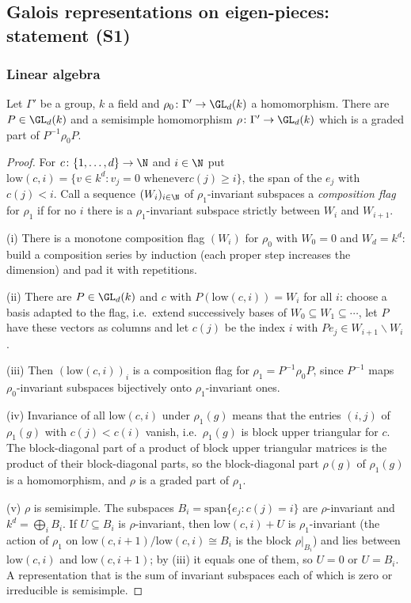 \subsection{Galois representations on eigen-pieces: statement (S1)}\label{sec:pf:steps2:repex}

\subsubsection{Linear algebra}

\begin{lemma}[Semisimplification]\label{lem:pf:steps2:grex}
Let $\Gamma'$ be a group, $k$ a field and $\rho_0\colon\Gamma'\to\GL_d(k)$ a homomorphism. There are
$P\in\GL_d(k)$ and a semisimple homomorphism $\rho\colon\Gamma'\to\GL_d(k)$ which is a graded part
of $P^{-1}\rho_0P$.
\end{lemma}

\begin{proof}
For $c\colon\{1,\dots,d\}\to\N$ and $i\in\N$ put $\mathrm{low}(c,i)=\{v\in k^d:v_j=0\text{ whenever
}c(j)\ge i\}$, the span of the $e_j$ with $c(j)<i$. Call a sequence $(W_i)_{i\in\N}$ of
$\rho_1$-invariant subspaces a \emph{composition flag} for $\rho_1$ if for no $i$ there is a
$\rho_1$-invariant subspace strictly between $W_i$ and $W_{i+1}$.

(i) There is a monotone composition flag $(W_i)$ for $\rho_0$ with $W_0=0$ and $W_d=k^d$: build a
composition series by induction (each proper step increases the dimension) and pad it with
repetitions.

(ii) There are $P\in\GL_d(k)$ and $c$ with $P(\mathrm{low}(c,i))=W_i$ for all $i$: choose a basis
adapted to the flag, i.e.\ extend successively bases of $W_0\subseteq W_1\subseteq\cdots$, let $P$
have these vectors as columns and let $c(j)$ be the index $i$ with $Pe_j\in W_{i+1}\smallsetminus
W_i$.

(iii) Then $(\mathrm{low}(c,i))_i$ is a composition flag for $\rho_1=P^{-1}\rho_0P$, since $P^{-1}$
maps $\rho_0$-invariant subspaces bijectively onto $\rho_1$-invariant ones.

(iv) Invariance of all $\mathrm{low}(c,i)$ under $\rho_1(g)$ means that the entries $(i,j)$ of
$\rho_1(g)$ with $c(j)<c(i)$ vanish, i.e.\ $\rho_1(g)$ is block upper triangular for $c$. The
block-diagonal part of a product of block upper triangular matrices is the product of their
block-diagonal parts, so the block-diagonal part $\rho(g)$ of $\rho_1(g)$ is a homomorphism, and
$\rho$ is a graded part of $\rho_1$.

(v) $\rho$ is semisimple. The subspaces $B_i=\mathrm{span}\{e_j:c(j)=i\}$ are $\rho$-invariant and
$k^d=\bigoplus_iB_i$. If $U\subseteq B_i$ is $\rho$-invariant, then $\mathrm{low}(c,i)+U$ is
$\rho_1$-invariant (the action of $\rho_1$ on $\mathrm{low}(c,i+1)/\mathrm{low}(c,i)\cong B_i$ is the
block $\rho|_{B_i}$) and lies between $\mathrm{low}(c,i)$ and $\mathrm{low}(c,i+1)$; by (iii) it
equals one of them, so $U=0$ or $U=B_i$. A representation that is the sum of invariant subspaces
each of which is zero or irreducible is semisimple.
\end{proof}

